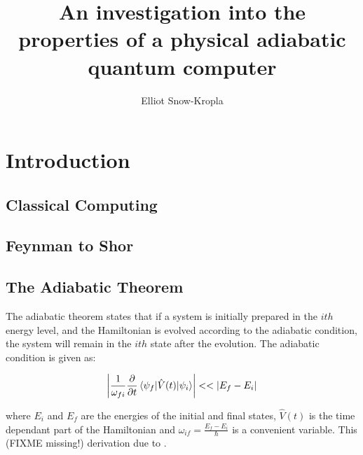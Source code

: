 \documentclass[12pt]{dalthesis}
\begin{document}
\title{An investigation into the properties of a physical adiabatic quantum computer}
\author{Elliot Snow-Kropla}



\frontmatter

\begin{abstract}

\end{abstract}

\begin{acknowledgements}
\end{acknowledgements}

\mainmatter

\chapter{Introduction}

\section{Classical Computing}

\section{Feynman to Shor}

\section{The Adiabatic Theorem}
The adiabatic theorem states that if a system is initially prepared in the $ith$ energy level, and the Hamiltonian is evolved according to the adiabatic condition, the system will remain in the $ith$ state after the evolution.  The adiabatic condition is given as:

\begin{displaymath}
	\left | \frac{1}{\omega_{fi}}\frac{\partial}{\partial t} \mathinner{\langle{\psi_f | \hat{V}(t) | \psi_i}\rangle} \right | << |E_f - E_i|
\end{displaymath}

where $E_i$ and $E_f$ are the energies of the initial and final states, $\hat{V}(t)$ is the time dependant part of the Hamiltonian and $\omega_{if} = \frac{E_f - E_i}{\hbar}$ is a convenient variable.  This (FIXME missing!) derivation due to \cite{zettili}.
\end{document}
